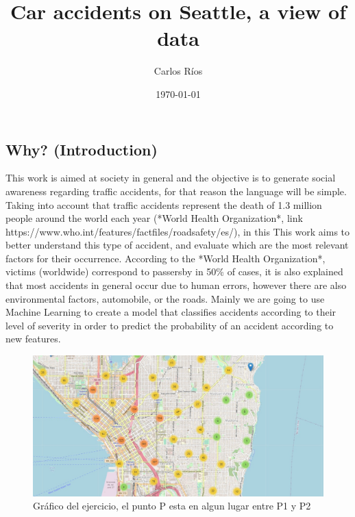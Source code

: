 \documentclass[12pt]{article}
\begin{document}
\title{Car accidents on Seattle, a view of data}

\author{Carlos Ríos} 
\date{\small{\today}}

\maketitle


\section*{}
\subsection*{Why? (Introduction)}
This work is aimed at society in general and the objective is to generate social awareness regarding traffic accidents, for that reason the language will be simple. Taking into account that traffic accidents represent the death of 1.3 million people around the world each year (*World Health Organization*, link https://www.who.int/features/factfiles/roadsafety/es/), in this This work aims to better understand this type of accident, and evaluate which are the most relevant factors for their occurrence. According to the *World Health Organization*, victims (worldwide) correspond to passersby in 50\% of cases, it is also explained that most accidents in general occur due to human errors, however there are also environmental factors, automobile, or the roads. Mainly we are going to use Machine Learning to create a model that classifies accidents according to their level of severity in order to predict the probability of an accident according to new features.
 \

\begin{figure}[htbp]
  \centering
    \includegraphics[width=1\textwidth]{../images/map_d.jpeg}
  \caption{Gráfico del ejercicio, el punto P esta en algun lugar entre P1 y P2}
  \label{fig:ejemplo}
\end{figure}
\end{document}
